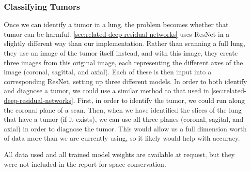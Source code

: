 \documentclass[10pt,twocolumn,letterpaper]{article}
\begin{document}
      \subsubsection{Classifying Tumors} \label{sec:classify-tumor}

         Once we can identify a tumor in a lung, the problem becomes whether that tumor can be harmful. \ref{sec:related-deep-residual-networks} uses ResNet in a slightly different way than our implementation. Rather than scanning a full lung, they use an image of the tumor itself instead, and with this image, they create three images from this original image, each representing the different axes of the image (coronal, sagittal, and axial). Each of these is then input into a corresponding ResNet, setting up three different models. In order to both identify and diagnose a tumor, we could use a similar method to that used in \ref{sec:related-deep-residual-networks}. First, in order to identify the tumor, we could run along the coronal plane of a scan. Then, when we have identified the slices of the lung that have a tumor (if it exists), we can use all three planes (coronal, sagital, and axial) in order to diagnose the tumor. This would allow us a full dimension worth of data more than we are currently using, so it likely would help with accuracy. 

  All data used and all trained model weights are available at request, but they were not included in the report for space conservation.


{\small



}
\end{document}
